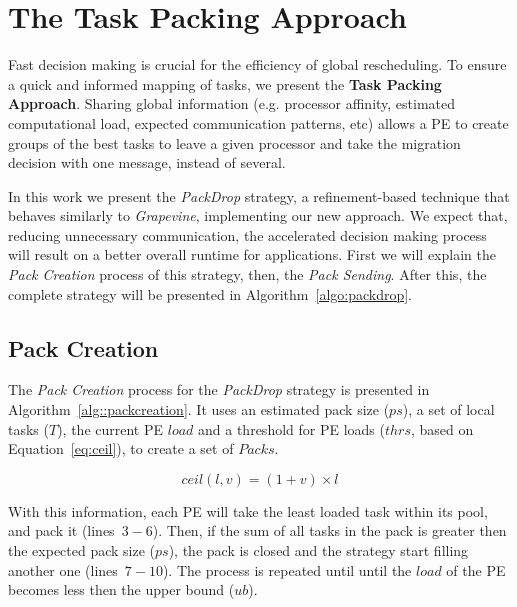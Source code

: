\section{The Task Packing Approach}

Fast decision making is crucial for the efficiency of global rescheduling.
To ensure a quick and informed mapping of tasks, we present the \textbf{Task Packing Approach}.
Sharing global information (e.g. processor affinity, estimated computational load, expected communication patterns, etc) allows a PE to create groups of the best tasks to leave a given processor and take the migration decision with one message, instead of several.

In this work we present the \textit{PackDrop} strategy, a refinement-based technique that behaves similarly to \textit{Grapevine}, implementing our new approach.
We expect that, reducing unnecessary communication, the accelerated decision making process will result on a better overall runtime for applications.
First we will explain the \textit{Pack Creation} process of this strategy, then, the \textit{Pack Sending}.
After this, the complete strategy will be presented in Algorithm~\ref{algo:packdrop}.

\subsection{Pack Creation}

The \textit{Pack Creation} process for the \textit{PackDrop} strategy is presented in Algorithm~\ref{alg::packcreation}.
It uses an estimated pack size ($ps$), a set of local tasks ($  T$), the current PE $load$ and a threshold for PE loads ($thrs$, based on Equation~\ref{eq:ceil}), to create a set of $Packs$.

\begin{equation}
	ceil(l,v) = (1+v)\times l
    \label{eq:ceil}
\end{equation}

With this information, each PE will take the least loaded task within its pool, and pack it (lines~$3-6$).
Then, if the sum of all tasks in the pack is greater then the expected pack size ($ps$), the pack is closed and the strategy start filling another one (lines~$7-10$).
The process is repeated until until the $load$ of the PE becomes less then the upper bound ($ub$).


